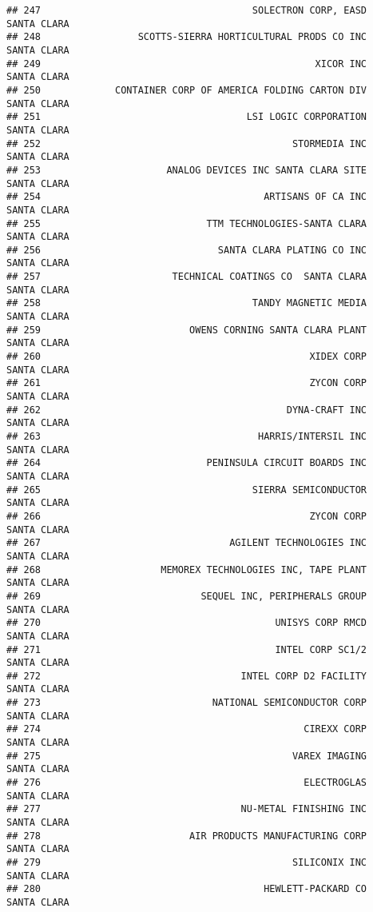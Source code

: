 \documentclass[
]{book}
\begin{document}
\begin{verbatim}
## 247                                     SOLECTRON CORP, EASD   SANTA CLARA
## 248                 SCOTTS-SIERRA HORTICULTURAL PRODS CO INC   SANTA CLARA
## 249                                                XICOR INC   SANTA CLARA
## 250             CONTAINER CORP OF AMERICA FOLDING CARTON DIV   SANTA CLARA
## 251                                    LSI LOGIC CORPORATION   SANTA CLARA
## 252                                            STORMEDIA INC   SANTA CLARA
## 253                      ANALOG DEVICES INC SANTA CLARA SITE   SANTA CLARA
## 254                                       ARTISANS OF CA INC   SANTA CLARA
## 255                             TTM TECHNOLOGIES-SANTA CLARA   SANTA CLARA
## 256                               SANTA CLARA PLATING CO INC   SANTA CLARA
## 257                       TECHNICAL COATINGS CO  SANTA CLARA   SANTA CLARA
## 258                                     TANDY MAGNETIC MEDIA   SANTA CLARA
## 259                          OWENS CORNING SANTA CLARA PLANT   SANTA CLARA
## 260                                               XIDEX CORP   SANTA CLARA
## 261                                               ZYCON CORP   SANTA CLARA
## 262                                           DYNA-CRAFT INC   SANTA CLARA
## 263                                      HARRIS/INTERSIL INC   SANTA CLARA
## 264                             PENINSULA CIRCUIT BOARDS INC   SANTA CLARA
## 265                                     SIERRA SEMICONDUCTOR   SANTA CLARA
## 266                                               ZYCON CORP   SANTA CLARA
## 267                                 AGILENT TECHNOLOGIES INC   SANTA CLARA
## 268                     MEMOREX TECHNOLOGIES INC, TAPE PLANT   SANTA CLARA
## 269                            SEQUEL INC, PERIPHERALS GROUP   SANTA CLARA
## 270                                         UNISYS CORP RMCD   SANTA CLARA
## 271                                         INTEL CORP SC1/2   SANTA CLARA
## 272                                   INTEL CORP D2 FACILITY   SANTA CLARA
## 273                              NATIONAL SEMICONDUCTOR CORP   SANTA CLARA
## 274                                              CIREXX CORP   SANTA CLARA
## 275                                            VAREX IMAGING   SANTA CLARA
## 276                                              ELECTROGLAS   SANTA CLARA
## 277                                   NU-METAL FINISHING INC   SANTA CLARA
## 278                          AIR PRODUCTS MANUFACTURING CORP   SANTA CLARA
## 279                                            SILICONIX INC   SANTA CLARA
## 280                                       HEWLETT-PACKARD CO   SANTA CLARA

\end{verbatim}
\end{document}
